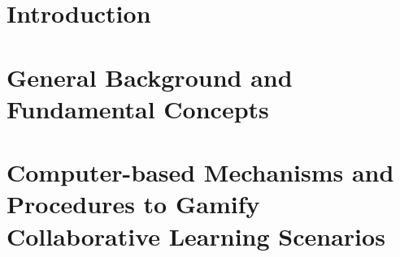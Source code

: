 \documentclass[doutorado, pre-defesa]{packages/icmc}
\begin{document}
\textual

\newcommand{\comando}[1]{\textbf{$\backslash$#1}}

\chapter{Introduction}
\label{chapter:introducao}


\chapter{General Background and Fundamental Concepts}
\label{chapter:general-background}
%






%


\chapter[Computer-based Mechanisms and Procedures to Gamify CL Scenarios]{Computer-based Mechanisms and Procedures to Gamify Collaborative Learning Scenarios}
\label{chapter:computer-based-mechanisms-procedures}

%

% 




\end{document}
